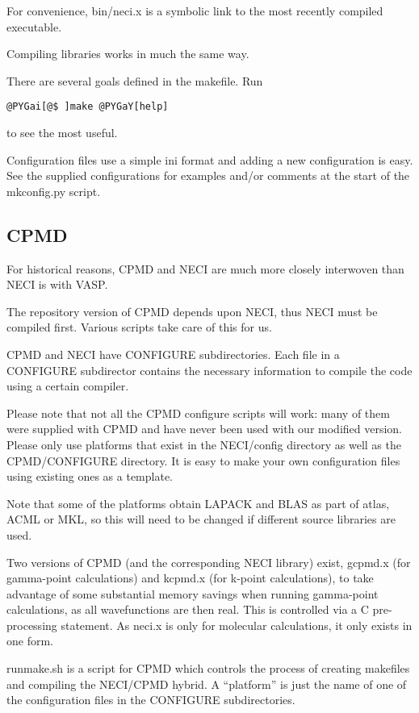 \documentclass[openany,a4paper,10pt,english]{manual}
\begin{document}
For convenience, bin/neci.x is a symbolic link to the most recently compiled
executable.

Compiling libraries works in much the same way.

There are several goals defined in the makefile.  Run

\begin{Verbatim}[commandchars=@\[\]]
@PYGai[@$ ]make @PYGaY[help]
\end{Verbatim}

to see the most useful.

Configuration files use a simple ini format and adding a new configuration is
easy. See the supplied configurations for examples and/or comments at the start
of the mkconfig.py script.


\subsection{CPMD}

For historical reasons, CPMD and NECI are much more closely interwoven
than NECI is with VASP.

The repository version of CPMD depends upon NECI, thus NECI must be
compiled first.  Various scripts take care of this for us.

CPMD and NECI have CONFIGURE subdirectories.  Each file in a CONFIGURE
subdirector contains the necessary information to compile the code using
a certain compiler.

Please note that not all the CPMD configure scripts will work: many of
them were supplied with CPMD and have never been used with our modified
version.  Please only use platforms that exist in the NECI/config directory as
well as the CPMD/CONFIGURE directory.  It is easy to make your own
configuration files using existing ones as a template.

Note that some of the platforms obtain LAPACK and BLAS as part of atlas,
ACML or MKL, so this will need to be changed if different source libraries
are used.

Two versions of CPMD (and the corresponding NECI library) exist, gcpmd.x
(for gamma-point calculations) and kcpmd.x (for k-point calculations),
to take advantage of some substantial memory savings when running
gamma-point calculations, as all wavefunctions are then real.  This is
controlled via a C pre-processing statement.  As neci.x is only for
molecular calculations, it only exists in one form.

runmake.sh is a script for CPMD which controls the process of creating
makefiles and compiling the NECI/CPMD hybrid.  A ``platform'' is just the name of
one of the configuration files in the CONFIGURE subdirectories.
\end{document}
